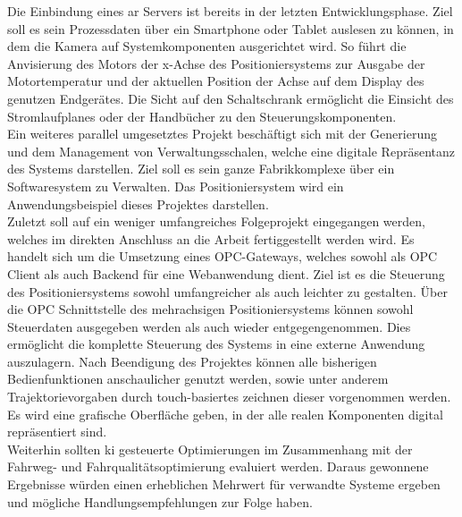 \documentclass[../../Bachelorarbeit.tex]{subfiles}
\begin{document}
Die Einbindung eines \acs{ar} Servers ist bereits in der letzten Entwicklungsphase. Ziel soll es sein Prozessdaten über ein Smartphone oder Tablet auslesen zu können, in dem die Kamera auf Systemkomponenten ausgerichtet wird. So führt \zB die Anvisierung des Motors der x-Achse des Positioniersystems zur Ausgabe der Motortemperatur und der aktuellen Position der Achse auf dem Display des genutzen Endgerätes. Die Sicht auf den Schaltschrank ermöglicht \bspw die Einsicht des Stromlaufplanes oder der Handbücher zu den Steuerungskomponenten.\\
Ein weiteres parallel umgesetztes Projekt beschäftigt sich mit der Generierung und dem Management von Verwaltungsschalen, welche eine digitale Repräsentanz des Systems darstellen. Ziel soll es sein ganze Fabrikkomplexe über ein Softwaresystem zu Verwalten. Das Positioniersystem wird ein Anwendungsbeispiel dieses Projektes darstellen.\\
Zuletzt soll auf ein weniger umfangreiches Folgeprojekt eingegangen werden, welches im direkten Anschluss an die Arbeit fertiggestellt werden wird. Es handelt sich um die Umsetzung eines OPC-Gateways, welches sowohl als OPC Client als auch Backend für eine Webanwendung dient. Ziel ist es die Steuerung des Positioniersystems sowohl umfangreicher als auch leichter zu gestalten. Über die OPC Schnittstelle des mehrachsigen Positioniersystems können sowohl Steuerdaten ausgegeben werden als auch wieder entgegengenommen. Dies ermöglicht die komplette Steuerung des Systems in eine externe Anwendung auszulagern. Nach Beendigung des Projektes können alle bisherigen Bedienfunktionen anschaulicher genutzt werden, sowie unter anderem Trajektorievorgaben durch touch-basiertes zeichnen dieser vorgenommen werden. Es wird eine grafische Oberfläche geben, in der alle realen Komponenten digital repräsentiert sind.\\
\bigskip \newline
Weiterhin sollten \acs{ki} gesteuerte Optimierungen im Zusammenhang mit der Fahrweg- und Fahrqualitätsoptimierung evaluiert werden. Daraus gewonnene Ergebnisse würden einen erheblichen Mehrwert für verwandte Systeme ergeben und mögliche Handlungsempfehlungen zur Folge haben.
\end{document}
